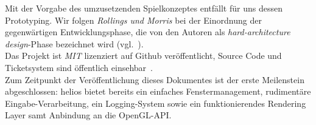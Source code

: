 \noindent
Mit der Vorgabe des umzusetzenden Spielkonzeptes entfällt für uns dessen Prototyping.
Wir folgen \textit{Rollings und Morris} bei der Einordnung der gegenwärtigen Entwicklungsphase, die von den Autoren als \textit{hard-architecture design}-Phase bezeichnet wird (vgl.~\cite[628]{RM04}).\\

Das Projekt ist \textit{MIT} lizenziert auf Github veröffentlicht, Source Code und Ticketsystem sind öffentlich einsehbar~\cite[]{heliosgithub}.\\

Zum Zeitpunkt der Veröffentlichung dieses Dokumentes ist der erste Meilenstein abgeschlossen: helios bietet bereits ein einfaches Fenstermanagement, rudimentäre Eingabe-Verarbeitung, ein Logging-System sowie ein funktionierendes Rendering Layer samt Anbindung an die OpenGL-API.\\

